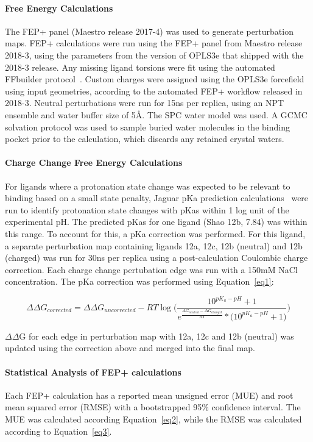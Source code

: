 \documentclass[9pt,lineno]{elife-modified} %
\begin{document}
\paragraph{Free Energy Calculations}
The FEP+ panel (Maestro release 2017-4) was used to generate perturbation maps. FEP+ calculations were run using the FEP+ panel from Maestro release 2018-3, using the parameters from the version of OPLS3e that shipped with the 2018-3 release. Any missing ligand torsions were fit using the automated FFbuilder protocol~\citep{Abel:Acc.Chem.Res.:2017}. Custom charges were assigned using the OPLS3e forcefield using input geometries, according to the automated FEP+ workflow released in 2018-3. Neutral perturbations were run for 15ns per replica, using an NPT ensemble and water buffer size of 5\AA. The SPC water model was used. A GCMC solvation protocol was used to sample buried water molecules in the binding pocket prior to the calculation, which discards any retained crystal waters. 

\paragraph{Charge Change Free Energy Calculations} 
For ligands where a protonation state change was expected to be relevant to binding based on a small state penalty, Jaguar pKa prediction calculations~\citep{Bochevarov2013-bn} were run to identify protonation state changes with pKas within 1 log unit of the experimental pH. The predicted pKas for one ligand (Shao 12b, 7.84) was within this range. To account for this, a pKa correction was performed. For this ligand, a separate perturbation map containing ligands 12a, 12c, 12b (neutral) and 12b (charged) was run for 30ns per replica using a post-calculation Coulombic charge correction. Each charge change pertubation edge was run with a 150mM NaCl concentration. The pKa correction was performed using Equation~\ref{eq1}: 

\begin{equation}\label{eq1}
\Delta\Delta G_{corrected} = \Delta\Delta G_{uncorrected} - RT\log\Bigg(\frac{10^{pK_a -pH}+1}{e^{\frac{\Delta G_{neutral} - \Delta G_{charged}}{RT}} * \big(10^{pK_a - pH}+1\big)}\Bigg)
\end{equation}

$\Delta\Delta$G for each edge in perturbation map with 12a, 12c and 12b (neutral) was updated using the correction above and merged into the final map. 

 
 \paragraph{Statistical Analysis of FEP+ calculations}
Each FEP+ calculation has a reported mean unsigned error (MUE) and root mean squared error (RMSE) with a bootstrapped 95\% confidence interval. The MUE was calculated according Equation~\ref{eq2}, while the RMSE was calculated according to Equation~\ref{eq3}. 
\end{document}
